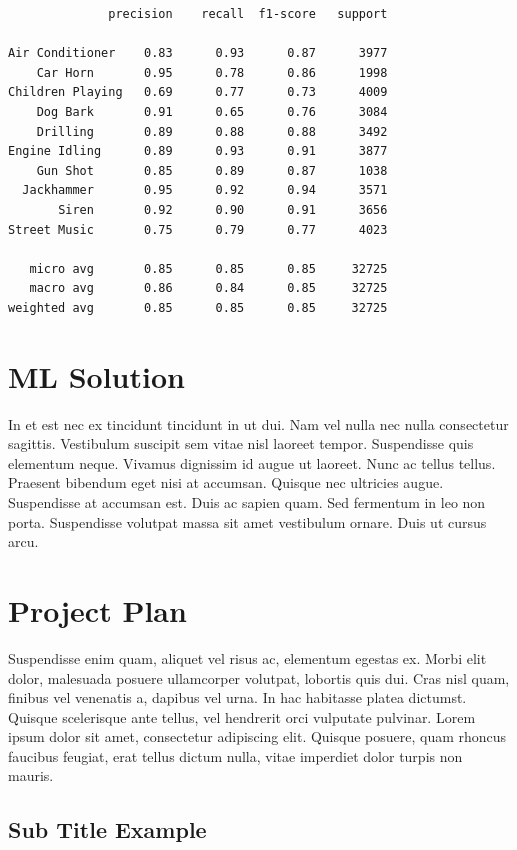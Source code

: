 \begin{verbatim}
              precision    recall  f1-score   support

Air Conditioner    0.83      0.93      0.87      3977
    Car Horn       0.95      0.78      0.86      1998
Children Playing   0.69      0.77      0.73      4009
    Dog Bark       0.91      0.65      0.76      3084
    Drilling       0.89      0.88      0.88      3492
Engine Idling      0.89      0.93      0.91      3877
    Gun Shot       0.85      0.89      0.87      1038
  Jackhammer       0.95      0.92      0.94      3571
       Siren       0.92      0.90      0.91      3656
Street Music       0.75      0.79      0.77      4023

   micro avg       0.85      0.85      0.85     32725
   macro avg       0.86      0.84      0.85     32725
weighted avg       0.85      0.85      0.85     32725
\end{verbatim}

\hypertarget{ml-solution}{%
\section{ML Solution}\label{ml-solution}}

In et est nec ex tincidunt tincidunt in ut dui. Nam vel nulla nec nulla
consectetur sagittis. Vestibulum suscipit sem vitae nisl laoreet tempor.
Suspendisse quis elementum neque. Vivamus dignissim id augue ut laoreet.
Nunc ac tellus tellus. Praesent bibendum eget nisi at accumsan. Quisque
nec ultricies augue. Suspendisse at accumsan est. Duis ac sapien quam.
Sed fermentum in leo non porta. Suspendisse volutpat massa sit amet
vestibulum ornare. Duis ut cursus arcu.

\hypertarget{project-plan}{%
\section{Project Plan}\label{project-plan}}

Suspendisse enim quam, aliquet vel risus ac, elementum egestas ex. Morbi
elit dolor, malesuada posuere ullamcorper volutpat, lobortis quis dui.
Cras nisl quam, finibus vel venenatis a, dapibus vel urna. In hac
habitasse platea dictumst. Quisque scelerisque ante tellus, vel
hendrerit orci vulputate pulvinar. Lorem ipsum dolor sit amet,
consectetur adipiscing elit. Quisque posuere, quam rhoncus faucibus
feugiat, erat tellus dictum nulla, vitae imperdiet dolor turpis non
mauris.

\hypertarget{sub-title-example}{%
\subsection{Sub Title Example}\label{sub-title-example}}


